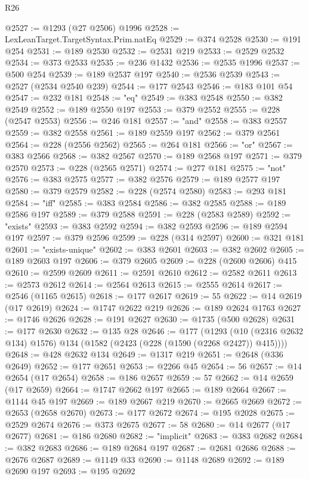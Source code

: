 \begin{lexlean}{R26}
\begin{coremodule}
@2527 := @1293 (@27 @2506) @1996
@2528 := LexLeanTarget.TargetSyntax.Prim.natEq
@2529 := @374 @2528
@2530 := @191 @254
@2531 := @189 @2530
@2532 := @2531 @219
@2533 := @2529 @2532
@2534 := @373 @2533
@2535 := @236 @1432
@2536 := @2535 @1996
@2537 := @500 @254
@2539 := @189 @2537 @197
@2540 := @2536 @2539
@2543 := @2527 (@2534 @2540 @239)
@2544 := @177 @2543
@2546 := @183 @101 @54
@2547 := @232 @181
@2548 := "eq"
@2549 := @383 @2548
@2550 := @382 @2549
@2552 := @189 @2550 @197
@2553 := @379 @2552
@2555 := @228 (@2547 @2553)
@2556 := @246 @181
@2557 := "and"
@2558 := @383 @2557
@2559 := @382 @2558
@2561 := @189 @2559 @197
@2562 := @379 @2561
@2564 := @228 (@2556 @2562)
@2565 := @264 @181
@2566 := "or"
@2567 := @383 @2566
@2568 := @382 @2567
@2570 := @189 @2568 @197
@2571 := @379 @2570
@2573 := @228 (@2565 @2571)
@2574 := @277 @181
@2575 := "not"
@2576 := @383 @2575
@2577 := @382 @2576
@2579 := @189 @2577 @197
@2580 := @379 @2579
@2582 := @228 (@2574 @2580)
@2583 := @293 @181
@2584 := "iff"
@2585 := @383 @2584
@2586 := @382 @2585
@2588 := @189 @2586 @197
@2589 := @379 @2588
@2591 := @228 (@2583 @2589)
@2592 := "exists"
@2593 := @383 @2592
@2594 := @382 @2593
@2596 := @189 @2594 @197
@2597 := @379 @2596
@2599 := @228 (@314 @2597)
@2600 := @321 @181
@2601 := "exists-unique"
@2602 := @383 @2601
@2603 := @382 @2602
@2605 := @189 @2603 @197
@2606 := @379 @2605
@2609 := @228 (@2600 @2606) @415
@2610 := @2599 @2609
@2611 := @2591 @2610
@2612 := @2582 @2611
@2613 := @2573 @2612
@2614 := @2564 @2613
@2615 := @2555 @2614
@2617 := @2546 (@1165 @2615)
@2618 := @177 @2617
@2619 := 55
@2622 := @14 @2619 (@17 @2619)
@2624 := @1747 @2622 @219
@2626 := @189 @2624 @1763
@2627 := @1746 @2626
@2628 := @191 @2627
@2630 := @1735 (@500 @2628)
@2631 := @177 @2630
@2632 := @135 @28
@2646 := @177
    (@1293 (@10 (@2316 @2632 @134) @1576) @134 (@1582 (@2423 (@228 (@1590 (@2268 @2427)) @415))))
@2648 := @428 @2632 @134
@2649 := @1317 @219
@2651 := @2648 (@336 @2649)
@2652 := @177 @2651
@2653 := @2266 @45
@2654 := 56
@2657 := @14 @2654 (@17 @2654)
@2658 := @186 @2657
@2659 := 57
@2662 := @14 @2659 (@17 @2659)
@2664 := @1747 @2662 @197
@2665 := @189 @2664
@2667 := @1144 @45 @197
@2669 := @189 @2667 @219
@2670 := @2665 @2669
@2672 := @2653 (@2658 @2670)
@2673 := @177 @2672
@2674 := @195 @2028
@2675 := @2529 @2674
@2676 := @373 @2675
@2677 := 58
@2680 := @14 @2677 (@17 @2677)
@2681 := @186 @2680
@2682 := "implicit"
@2683 := @383 @2682
@2684 := @382 @2683
@2686 := @189 @2684 @197
@2687 := @2681 @2686
@2688 := @2676 @2687
@2689 := @1149 @33
@2690 := @1148 @2689
@2692 := @189 @2690 @197
@2693 := @195 @2692

\end{coremodule}
\end{lexlean}
